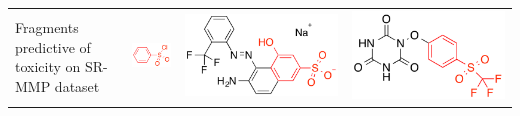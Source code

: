 \documentclass[landscape,a0b,final,a4resizeable]{include/a0poster}
\begin{document}
\begin{poster}
\begin{multicols}{3}
\begin{center}
\begin{tabular}{>{\centering}m{\mywidthb} >{\centering}m{\mywidtha} >{\centering}m{\mywidtha} >{\centering\arraybackslash}m{\mywidtha}}
\vspace{0.5in}Fragments predictive of toxicity on SR-MMP dataset\vspace{0.5in}
& \includegraphics[width=7cm]{figures/jorge-figures/7.png} 
& \includegraphics[width=\mywidtha]{figures/jorge-figures/8.png}
& \includegraphics[width=\mywidtha]{figures/jorge-figures/9.png}\\

\end{tabular}
\end{center}
\end{multicols}
\end{poster}
\end{document}
